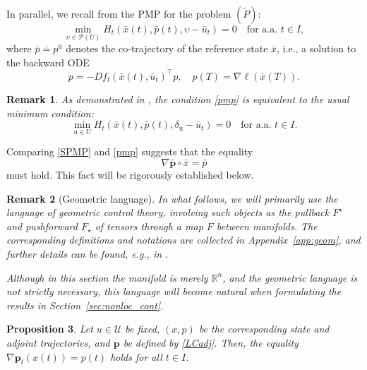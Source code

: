 \documentclass[sn-mathphys-num]{sn-jnl}
\numberwithin{equation}{section}
\theoremstyle{mythm}
\newtheorem{proposition}{Proposition}[section]
\theoremstyle{mydef}
\newtheorem{remark}[proposition]{Remark}
\newcommand{\T}{\intercal}
\begin{document}
In parallel, we recall from  \cite[Theorem~7.1]{Gamkrelidze1978} the PMP for the problem \( (\widetilde{P}) \):
\begin{equation}
\label{pmp}
  \min_{\upsilon \in \mathcal{P}(U)} H_t\left( \bar{x}(t), \bar{p}(t), \upsilon - \bar{u}_t \right) = 0 \quad \text{for a.a. } t \in I,
\end{equation}
where \( \bar{p} \doteq p^{\bar{u}} \) denotes the co-trajectory of the reference state \( \bar{x} \), i.e., a solution to the backward ODE
\begin{equation}
\label{eq:NLadjoint}
    \dot{p} = - Df_t(\bar{x}(t), \bar{u}_t)^\T p, \quad p(T) = \nabla \ell(\bar{x}(T)).
\end{equation}

\begin{remark}
    As demonstrated in \cite[p. 116]{Gamkrelidze1978}, the condition \eqref{pmp} is equivalent to the usual minimum condition:
    \[
        \min_{\mathrm u \in U} H_t\left(\bar{x}(t), \bar p(t), \delta_{\mathrm u}- \bar u_t\right) = 0 
        \quad \text{for a.a. } t \in I.
    \]
\end{remark}

Comparing \eqref{SPMP} and \eqref{pmp} suggests that the equality 
$$
\nabla \bar{\bm{p}} \circ \bar{x} = \bar{p}
$$
must hold. This fact will be rigorously established below.


\begin{remark}[Geometric language]
  In what follows, we will primarily use the language of geometric control theory, involving such objects as the \emph{pullback} \( F^\star \) and \emph{pushforward} \( F_\star \)  of tensors through a map \( F \) between manifolds. The corresponding definitions and notations are collected in Appendix~\ref{app:geom}, and further details can be found, e.g., in \cite{agrachevControlTheoryGeometric2004}.
  
  
  Although in this section the manifold is merely \( \mathbb{R}^n \), and the geometric language is not strictly necessary, this language will become natural when formulating the results in Section~\ref{sec:nonloc_cont}.
\end{remark}
\begin{proposition}
  \label{prop:NLdiff}
  Let \( u \in \mathcal{U} \) be fixed, \( (x, p) \) be the corresponding state and adjoint trajectories, and $\bm p$ be defined by \eqref{LCadj}. Then, the equality \( \nabla \bm{p}_t(x(t)) = p(t) \) holds for all \( t \in I \).
\end{proposition}
\end{document}
